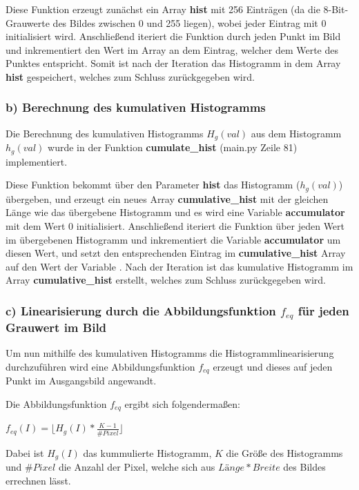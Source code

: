 \documentclass[12pt]{article}
\begin{document}
Diese Funktion erzeugt zunächst ein Array \textbf{hist} mit 256 Einträgen (da die 8-Bit-Grauwerte des Bildes zwischen 0 und 255 liegen), wobei jeder Eintrag mit 0 initialisiert wird.
Anschließend iteriert die Funktion durch jeden Punkt im Bild und inkrementiert den Wert im Array an dem Eintrag, welcher dem Werte des Punktes entspricht.
Somit ist nach der Iteration das Histogramm in dem Array \textbf{hist} gespeichert, welches zum Schluss zurückgegeben wird.

\subsubsection*{b) Berechnung des kumulativen Histogramms}
Die Berechnung des kumulativen Histogramms $H_g(val)$ aus dem Histogramm $h_g(val)$ wurde in der Funktion \textbf{cumulate\_hist} (main.py Zeile 81) implementiert.

Diese Funktion bekommt über den Parameter \textbf{hist} das Histogramm ($h_g(val)$) übergeben, und erzeugt ein neues Array \textbf{cumulative\_hist} mit der gleichen Länge wie das übergebene Histogramm und es wird eine Variable \textbf{accumulator} mit dem Wert 0 initialisiert.
Anschließend iteriert die Funktion über jeden Wert im übergebenen Histogramm und inkrementiert die Variable \textbf{accumulator} um diesen Wert, und setzt den entsprechenden Eintrag im \textbf{cumulative\_hist} Array auf den Wert der Variable .
Nach der Iteration ist das kumulative Histogramm im Array \textbf{cumulative\_hist} erstellt, welches zum Schluss zurückgegeben wird.


\subsubsection*{c) Linearisierung durch die Abbildungsfunktion $f_{eq}$ für jeden Grauwert im Bild}
Um nun mithilfe des kumulativen Histogramms die Histogrammlinearisierung durchzuführen wird eine Abbildungsfunktion $f_{eq}$ erzeugt und dieses auf jeden Punkt im Ausgangsbild angewandt.

Die Abbildungsfunktion $f_{eq}$ ergibt sich folgendermaßen:

\begin{math}
  f_{eq}(I) = \lfloor H_g(I) * \frac{K - 1}{\#Pixel} \rfloor
\end{math}

Dabei ist $H_g(I)$ das kummulierte Histogramm, $K$ die Größe des Histogramms und $\#Pixel$ die Anzahl der Pixel, welche sich aus $Länge * Breite$ des Bildes errechnen lässt.
\end{document}
